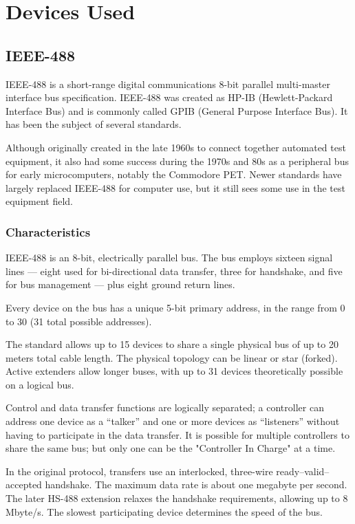 \documentclass[12pt]{article}
\begin{document}
\section{Devices Used}
\subsection{IEEE-488}
IEEE-488 is a short-range digital communications 8-bit parallel multi-master interface bus specification. IEEE-488 was created as HP-IB (Hewlett-Packard Interface Bus) and is commonly called GPIB (General Purpose Interface Bus). It has been the subject of several standards.\par 

Although originally created in the late 1960s to connect together automated test equipment, it also had some success during the 1970s and 80s as a peripheral bus for early microcomputers, notably the Commodore PET. Newer standards have largely replaced IEEE-488 for computer use, but it still sees some use in the test equipment field.
\subsubsection{ Characteristics}
IEEE-488 is an 8-bit, electrically parallel bus. The bus employs sixteen signal lines — eight used for bi-directional data transfer, three for handshake, and five for bus management — plus eight ground return lines.\par 

Every device on the bus has a unique 5-bit primary address, in the range from 0 to 30 (31 total possible addresses).\par 

The standard allows up to 15 devices to share a single physical bus of up to 20 meters total cable length. The physical topology can be linear or star (forked). Active extenders allow longer buses, with up to 31 devices theoretically possible on a logical bus.\par 

Control and data transfer functions are logically separated; a controller can address one device as a “talker” and one or more devices as “listeners” without having to participate in the data transfer. It is possible for multiple controllers to share the same bus; but only one can be the "Controller In Charge" at a time.\par 

In the original protocol, transfers use an interlocked, three-wire ready–valid–accepted handshake. The maximum data rate is about one megabyte per second. The later HS-488 extension relaxes the handshake requirements, allowing up to 8 Mbyte/s. The slowest participating device determines the speed of the bus.\par 
\end{document}
